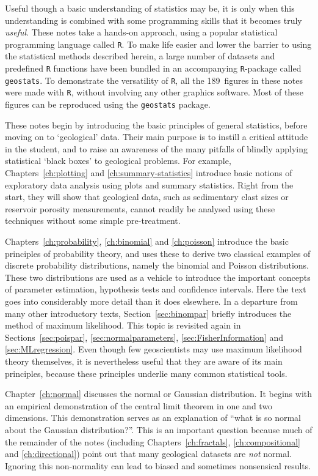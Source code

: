 Useful though a basic understanding of statistics may be, it is only
when this understanding is combined with some programming skills that
it becomes truly \emph{useful}. These notes take a hands-on approach,
using a popular statistical programming language called \texttt{R}.
To make life easier and lower the barrier to using the statistical
methods described herein, a large number of datasets and predefined
\texttt{R} functions have been bundled in an accompanying
\texttt{R}-package called \texttt{geostats}.  To demonstrate the
versatility of \texttt{R}, all the 189~figures in these notes were
made with \texttt{R}, without involving any other graphics
software. Most of these figures can be reproduced using the
\texttt{geostats} package.\medskip

These notes begin by introducing the basic principles of general
statistics, before moving on to `geological' data. Their main purpose
is to instill a critical attitude in the student, and to raise an
awareness of the many pitfalls of blindly applying statistical `black
boxes' to geological problems. For example, Chapters~\ref{ch:plotting}
and \ref{ch:summary-statistics} introduce basic notions of exploratory
data analysis using plots and summary statistics. Right from the
start, they will show that geological data, such as sedimentary clast
sizes or reservoir porosity measurements, cannot readily be analysed
using these techniques without some simple pre-treatment.\medskip

Chapters~\ref{ch:probability}, \ref{ch:binomial} and \ref{ch:poisson}
introduce the basic principles of probability theory, and uses these
to derive two classical examples of discrete probability
distributions, namely the binomial and Poisson distributions. These
two distributions are used as a vehicle to introduce the important
concepts of parameter estimation, hypothesis tests and confidence
intervals. Here the text goes into considerably more detail than it
does elsewhere. In a departure from many other introductory texts,
Section~\ref{sec:binompar} briefly introduces the method of maximum
likelihood. This topic is revisited again in
Sections~\ref{sec:poispar}, \ref{sec:normalparameters},
\ref{sec:FisherInformation} and \ref{sec:MLregression}. Even though
few geoscientists may use maximum likelihood theory themselves, it is
nevertheless useful that they are aware of its main principles,
because these principles underlie many common statistical tools.\medskip

Chapter~\ref{ch:normal} discusses the normal or Gaussian
distribution. It begins with an empirical demonstration of the central
limit theorem in one and two dimensions. This demonstration serves as
an explanation of ``what is so normal about the Gaussian
distribution?''.  This is an important question because much of the
remainder of the notes (including Chapters~\ref{ch:fractals},
\ref{ch:compositional} and \ref{ch:directional}) point out that many
geological datasets are \emph{not} normal. Ignoring this non-normality
can lead to biased and sometimes nonsensical results.\medskip

